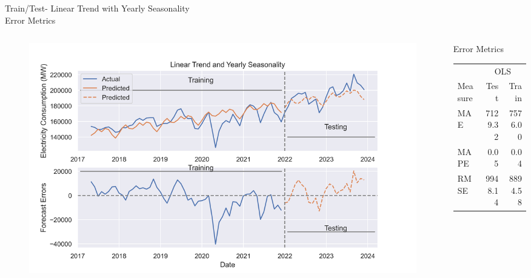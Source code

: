 \documentclass{beamer}
\begin{document}
\begin{frame}{Train/Test- Linear Trend with Yearly Seasonality \\Error Metrics  }
\centering
\begin{columns}[t]
 \begin{column}{0.48\textwidth}
 
  \begin{block}{}
   \begin{figure}
    \centering
        \includegraphics[width=\linewidth]{images/Monthly_test_train.png}
        \label{fig:a}
   \end{figure}
  \end{block}   
 \end{column}
 \begin{column}{0.48\textwidth}
 
  \begin{block}{Error Metrics}
   
    \centering
       \begin{tabular}{l|r|r}
\toprule
 & \multicolumn{2}{c}{OLS} \\
Measure & Test & Train \\
\midrule
MAE & 7129.32 & 7576.00 \\
\midrule
MAPE & 0.05 & 0.04 \\
\midrule
RMSE & 9948.14 & 8894.58\\
\bottomrule
\end{tabular}
   
  \end{block}   
 \end{column}

\end{columns}
\end{frame}
\end{document}
